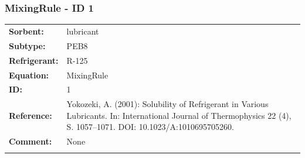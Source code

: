 \subsubsection{MixingRule - ID 1}
%
\begin{tabular}[l]{|lp{11.5cm}|}
\hline
\addlinespace

\textbf{Sorbent:} & lubricant \\
\textbf{Subtype:} & PEB8 \\
\textbf{Refrigerant:} & R-125 \\
\textbf{Equation:} & MixingRule \\
\textbf{ID:} & 1 \\
\textbf{Reference:} & Yokozeki, A. (2001): Solubility of Refrigerant in Various Lubricants. In: International Journal of Thermophysics 22 (4), S. 1057–1071. DOI: 10.1023/A:1010695705260. \\
\textbf{Comment:} & None \\

\addlinespace
\hline
\end{tabular}
\newline

